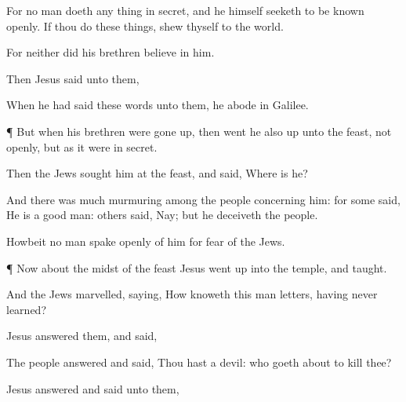 {For
{} no
man
{}
doeth any
thing
in
secret,
and
he
himself
seeketh to be
known
openly.
If thou
do these
things,
shew
thyself to the
world.

For
neither
did
his
brethren
believe
in
him.

Then
Jesus
said unto
them,
{}



When he had
said these
words unto
them, he
abode
{}
in
Galilee.


\par }{\PP {}¶
But
when
his
brethren were gone
up,
then
went
he
also
up
unto the
feast,
not
openly,
but as it
were
in
secret.

Then the
Jews
sought
him
at the
feast,
and
said,
Where
is
he?

And there
was
much
murmuring
among the
people
concerning
him: for
some
said, He
is a good
man:
others
said,
Nay;
but he
deceiveth the
people.

Howbeit no
man
spake
openly
of
him
for
fear of the
Jews.


\par }{\PP {}¶
Now about the
midst of the
feast
Jesus went
up
into the
temple,
and
taught.

And the
Jews
marvelled,
saying,
How
knoweth this
man
letters,
having
never
learned?

Jesus
answered
them,
and
said,
{}




The
people
answered
and
said, Thou
hast a
devil:
who goeth
about to
kill
thee?

Jesus
answered
and
said unto
them,
{}

}
